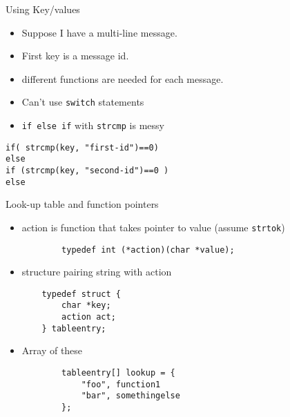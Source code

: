 \documentclass[xcolor=svgnames]{beamer}
\begin{document}
\begin{frame}[fragile]{Using Key/values}
\begin{itemize}
    \item  Suppose I have a multi-line message.
    \item First key is a message id.
    \item different functions are needed for each message.
    \item Can't use \texttt{switch} statements
    \item \texttt{if  else if} with \texttt{strcmp} is messy
\end{itemize}
\begin{exampleblock}{}
\begin{verbatim}
if( strcmp(key, "first-id")==0)
else
if (strcmp(key, "second-id")==0 )
else
\end{verbatim}
\end{exampleblock}
\end{frame}

\begin{frame}[fragile]{Look-up table and function pointers}
\begin{itemize}
    \item action is function that takes pointer to value (assume \texttt{strtok})\\
    \begin{verbatim}
        typedef int (*action)(char *value);
    \end{verbatim}
    \item structure pairing string with action
    \begin{verbatim}
    typedef struct {
        char *key;
        action act;
    } tableentry;
    \end{verbatim}
    \item Array of these
    \begin{verbatim}
        tableentry[] lookup = {
            "foo", function1
            "bar", somethingelse
        };
    \end{verbatim}
\end{itemize}
\end{frame}
\end{document}
